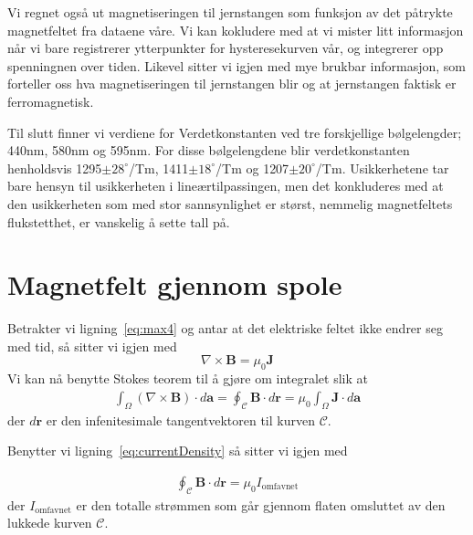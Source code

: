 \documentclass[a4paper,11pt, twocolumn]{article}
\begin{document}
Vi regnet også ut magnetiseringen til jernstangen som funksjon av det påtrykte magnetfeltet fra dataene våre. Vi kan kokludere med at vi mister litt informasjon når vi bare registrerer ytterpunkter for hysteresekurven vår, og integrerer opp spenningnen over tiden. Likevel sitter vi igjen med mye brukbar informasjon, som forteller oss hva magnetiseringen til jernstangen blir og at jernstangen faktisk er ferromagnetisk. 

Til slutt finner vi verdiene for Verdetkonstanten ved tre forskjellige bølgelengder; 440nm, 580nm og 595nm. For disse bølgelengdene blir verdetkonstanten henholdsvis 1295$\pm 28^\circ$/Tm, 1411$\pm18^\circ$/Tm og 1207$\pm20^\circ$/Tm. Usikkerhetene tar bare hensyn til usikkerheten i lineærtilpassingen, men det konkluderes med at den usikkerheten som med stor sannsynlighet er størst, nemmelig magnetfeltets flukstetthet, er vanskelig å sette tall på.
\printbibliography
\onecolumn
\appendix


\section{Magnetfelt gjennom spole}
\label{app:magspole}
Betrakter vi ligning~\eqref{eq:max4} og antar at det elektriske feltet ikke endrer seg med tid, så sitter vi igjen med 
\begin{equation}
	\nabla\times\mathbf{B} = \mu_0\mathbf{J}
	\label{eq:independentOfTime}
\end{equation}
Vi kan nå benytte Stokes teorem til å gjøre om integralet slik at
\begin{align}
	\int_\Omega (\nabla\times\mathbf{B})\cdot d\mathbf{a} = \oint_\mathcal{C}\mathbf{B}\cdot d\mathbf{r}=\mu_0\int_\Omega \mathbf{J} \cdot d\mathbf{a} 
	\label{}
\end{align}
der $d\mathbf{r}$ er den infenitesimale tangentvektoren til kurven $\mathcal{C}$. 

Benytter vi ligning~\eqref{eq:currentDensity} så sitter vi igjen med 

\begin{align}
	\oint_\mathcal{C}\mathbf{B}\cdot d\mathbf{r}=\mu_0 I_\text{omfavnet}
	\label{eq:etterStokes}
\end{align}
der $I_\text{omfavnet}$ er den totalle strømmen som går gjennom flaten omsluttet av den lukkede kurven $\mathcal{C}$.
\end{document}

